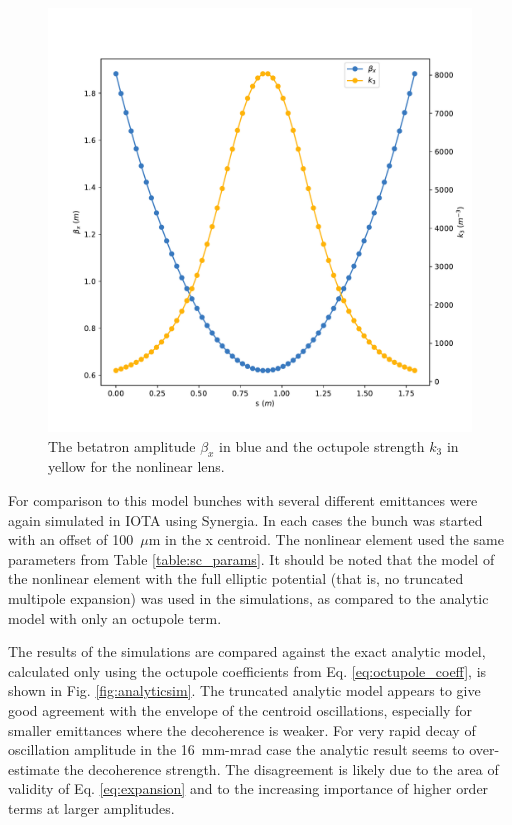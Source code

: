 \documentclass[aps,prstab,twocolumn, groupedaddress]{revtex4-1}
\begin{document}

\begin{figure}
	\includegraphics[width=0.85\columnwidth]{envelope.pdf}
	\caption{The betatron amplitude $\beta_x$ in blue and the octupole strength $k_3$ in 
		yellow for the nonlinear lens.}
	\label{fig:envelope_nl}
\end{figure}

For comparison to this model bunches with several different emittances were again 
simulated in 
IOTA using Synergia. In each cases the bunch was started with an 
offset of 100~$\mu$m in the x centroid. The nonlinear element used the same parameters 
from Table \ref{table:sc_params}.  It should be noted that the model of the nonlinear 
element with the full elliptic potential (that is, no truncated multipole expansion) was used 
in the simulations, as compared to the analytic model with only an octupole term. 

The results of the simulations are compared against the exact analytic model, calculated 
only using the octupole coefficients from Eq. \ref{eq:octupole_coeff}, is shown in Fig. 
\ref{fig:analyticsim}. The truncated analytic model appears to give good agreement with 
the 
envelope of the centroid oscillations, especially for smaller emittances where the 
decoherence is weaker. For very rapid decay of oscillation amplitude in the 
16~mm-mrad case the analytic result seems to over-estimate the decoherence strength. 
The disagreement is likely due to the area of validity of Eq. \ref{eq:expansion} and to the 
increasing importance of higher order terms at larger amplitudes.
\end{document}
